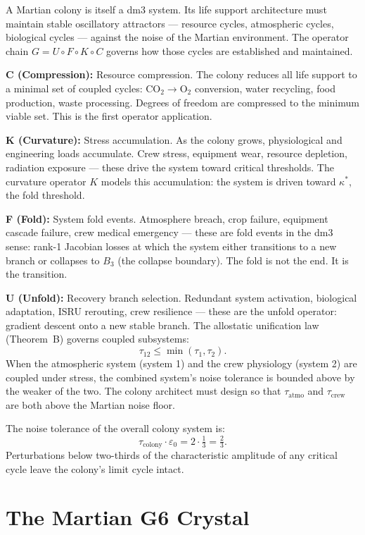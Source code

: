A Martian colony is itself a dm3 system. Its life support architecture
must maintain stable oscillatory attractors --- resource cycles,
atmospheric cycles, biological cycles --- against the noise of the
Martian environment. The operator chain $G = U \circ F \circ K \circ C$
governs how those cycles are established and maintained.

\textbf{C (Compression):} Resource compression. The colony reduces
all life support to a minimal set of coupled cycles: $\mathrm{CO_2}
\to \mathrm{O_2}$ conversion, water recycling, food production, waste
processing. Degrees of freedom are compressed to the minimum viable
set. This is the first operator application.

\textbf{K (Curvature):} Stress accumulation. As the colony grows,
physiological and engineering loads accumulate. Crew stress,
equipment wear, resource depletion, radiation exposure --- these drive
the system toward critical thresholds. The curvature operator $K$
models this accumulation: the system is driven toward $\kappa^*$,
the fold threshold.

\textbf{F (Fold):} System fold events. Atmosphere breach, crop failure,
equipment cascade failure, crew medical emergency --- these are
fold events in the dm3 sense: rank-1 Jacobian losses at which the
system either transitions to a new branch or collapses to $B_3$
(the collapse boundary). The fold is not the end. It is the transition.

\textbf{U (Unfold):} Recovery branch selection. Redundant system
activation, biological adaptation, ISRU rerouting, crew resilience ---
these are the unfold operator: gradient descent onto a new stable
branch. The allostatic unification law (Theorem~B) governs coupled
subsystems:
\[
\tau_{12} \leq \min(\tau_1, \tau_2).
\]
When the atmospheric system (system 1) and the crew physiology
(system 2) are coupled under stress, the combined system's noise
tolerance is bounded above by the weaker of the two. The colony
architect must design so that $\tau_{\text{atmo}}$ and
$\tau_{\text{crew}}$ are both above the Martian noise floor.

The noise tolerance of the overall colony system is:
\[
\tau_{\text{colony}} \cdot \varepsilon_0 = 2 \cdot \tfrac{1}{3} = \tfrac{2}{3}.
\]
Perturbations below two-thirds of the characteristic amplitude of any
critical cycle leave the colony's limit cycle intact.

\section{The Martian G6 Crystal}
\label{sec:mars-crystal}

